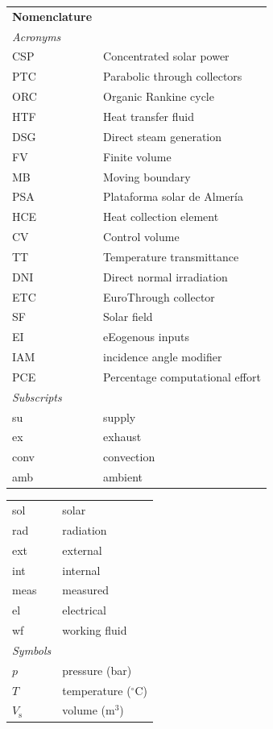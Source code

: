 \documentclass[final,3p,times,review]{elsarticle}
\begin{document}

\begin{table}[h!]
\begin{tabular}{lp{7.5cm}}
\textbf{Nomenclature}\\
\textit{Acronyms} \\
CSP & Concentrated solar power\\
PTC & Parabolic through collectors\\
ORC & Organic Rankine cycle\\
HTF & Heat transfer fluid\\
DSG & Direct steam generation\\
FV  & Finite volume \\
MB & Moving boundary \\
PSA & Plataforma solar de Almer\' ia \\
HCE & Heat collection element \\
CV & Control volume \\
TT & Temperature transmittance \\
DNI & Direct normal irradiation \\
ETC & EuroThrough collector \\
SF & Solar field \\
EI & eEogenous inputs \\
IAM & incidence angle modifier \\
PCE & Percentage computational effort \\
\textit{Subscripts} \\
su  & supply \\
ex & exhaust \\
conv & convection \\
amb & ambient \\
\end{tabular}
\begin{tabular}{lp{7.5cm}}
sol  & solar\\
rad & radiation\\
ext & external\\
int & internal \\
meas & measured \\
el & electrical \\
wf & working fluid \\
\textit{Symbols} \\
$p$ & pressure (bar)\\
$T$ & temperature ($^{\circ}$C)\\
$V_\mathrm{s}$ & volume (m$^3$)\\

\end{tabular}
\end{table}
\end{document}
